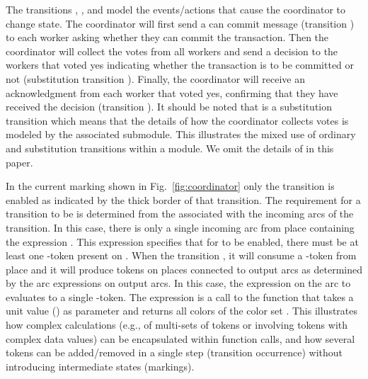 The transitions , , and
 model the
events/actions that cause the coordinator to change state. The
coordinator will first send a can commit message (transition
) to each worker asking whether they can commit
the transaction. Then the coordinator will collect the votes from all
workers and send a decision to the workers that voted yes indicating
whether the transaction is to be committed or not (substitution
transition ). Finally, the coordinator will
receive an acknowledgment from each worker that voted yes, confirming
that they have received the decision (transition
).  It should be noted that
 is a substitution transition which means that
the details of how the coordinator collects votes is modeled by the
associated  submodule. This illustrates the
mixed use of ordinary and substitution transitions within a module. We
omit the details of  in this paper.


In the current marking shown in Fig.~\ref{fig:coordinator} only the
transition  is enabled as indicated by the
thick border of that transition. The requirement for a transition to
be  is determined from the 
associated with the incoming arcs of the transition. In this case,
there is only a single incoming arc from place 
containing the expression \smlcode{()}. This expression specifies that
for  to be enabled, there must be at least one
\smlcode{()}-token present on . When the
 transition , it will consume a
\smlcode{()}-token from place  and it will produce
tokens on places connected to output arcs as determined by
 the arc expressions on output arcs. In this case,
the expression \smlcode{()} on the arc to 
evaluates to a single \smlcode{()}-token. The expression
 is a call to the function 
that takes a unit value (\smlcode{()}) as parameter and returns all
colors of the color set . This illustrates how complex
calculations (e.g., of multi-sets of tokens or involving tokens with
complex data values) can be encapsulated within function calls, and
how several tokens can be added/removed in a single step (transition
occurrence) without introducing intermediate states (markings).

